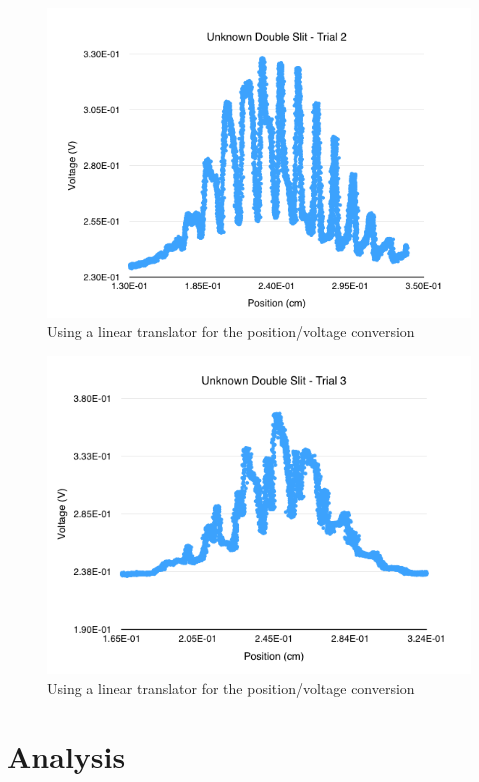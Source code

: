 \documentclass{article}
\begin{document}
\begin{figure}[H]
    \centering
    \includegraphics[width=\textwidth]{charts/unknown2}
    \caption{Using a linear translator for the position/voltage conversion}
    \label{unknown2}
\end{figure}

\begin{figure}[H]
    \centering
    \includegraphics[width=\textwidth]{charts/unknown3}
    \caption{Using a linear translator for the position/voltage conversion}
    \label{unknown3}
\end{figure}

\section{Analysis}
\end{document}
